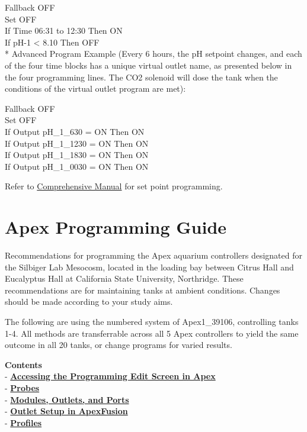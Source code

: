 \documentclass[]{book}
\begin{document}
Fallback OFF\\
Set OFF\\
If Time 06:31 to 12:30 Then ON\\
If pH-1 \textless{} 8.10 Then OFF\\
* Advanced Program Example (Every 6 hours, the pH setpoint changes, and
each of the four time blocks has a unique virtual outlet name, as
presented below in the four programming lines. The CO2 solenoid will
dose the tank when the conditions of the virtual outlet program are
met):

Fallback OFF\\
Set OFF\\
If Output pH\_1\_630 = ON Then ON\\
If Output pH\_1\_1230 = ON Then ON\\
If Output pH\_1\_1830 = ON Then ON\\
If Output pH\_1\_0030 = ON Then ON

Refer to
\href{https://github.com/SilbigerLab/Mesocosm_User_Manual/tree/7503b88686aef920c4a4ed473b1efe37b34dae10/Manuals/Apex_Comprehensive_Reference_Manual.pdf}{Comprehensive
Manual} for set point programming.

\chapter{Apex Programming Guide}\label{apex-programming-guide}

Recommendations for programming the Apex aquarium controllers designated
for the Silbiger Lab Mesocosm, located in the loading bay between Citrus
Hall and Eucalyptus Hall at California State University, Northridge.
These recommendations are for maintaining tanks at ambient conditions.
Changes should be made according to your study aims.

The following are using the numbered system of Apex1\_39106, controlling
tanks 1-4. All methods are transferrable across all 5 Apex controllers
to yield the same outcome in all 20 tanks, or change programs for varied
results.

\textbf{Contents}\\
- \protect\hyperlink{Programm_Screen}{\textbf{Accessing the Programming
Edit Screen in Apex}}\\
- \protect\hyperlink{Probes}{\textbf{Probes}}\\
- \protect\hyperlink{Modules_Outlets_and_Ports}{\textbf{Modules,
Outlets, and Ports}}\\
- \protect\hyperlink{Outlet_Setup}{\textbf{Outlet Setup in
ApexFusion}}\\
- \protect\hyperlink{Profiles}{\textbf{Profiles}}
\end{document}
